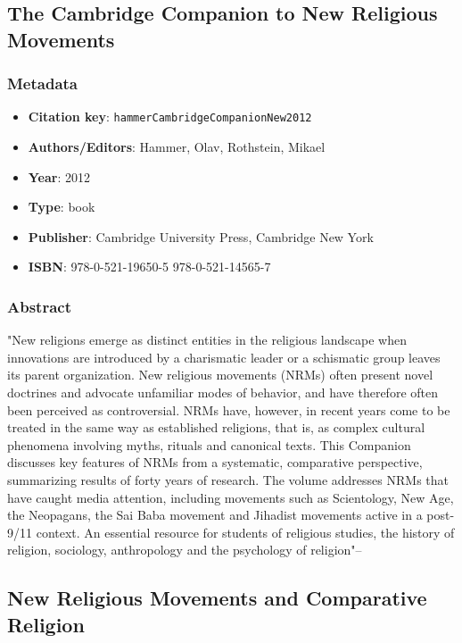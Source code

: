 \subsection{The Cambridge Companion to New Religious Movements}\label{lit:hammerCambridgeCompanionNew2012}
\subsubsection*{Metadata}
\begin{itemize}
  \item \textbf{Citation key}: \texttt{hammerCambridgeCompanionNew2012}
  \item \textbf{Authors/Editors}: Hammer, Olav, Rothstein, Mikael
  \item \textbf{Year}: 2012
  \item \textbf{Type}: book
  \item \textbf{Publisher}: Cambridge University Press, Cambridge New York
  \item \textbf{ISBN}: 978-0-521-19650-5 978-0-521-14565-7
\end{itemize}
\subsubsection*{Abstract}
"New religions emerge as distinct entities in the religious landscape when innovations are introduced by a charismatic leader or a schismatic group leaves its parent organization. New religious movements (NRMs) often present novel doctrines and advocate unfamiliar modes of behavior, and have therefore often been perceived as controversial. NRMs have, however, in recent years come to be treated in the same way as established religions, that is, as complex cultural phenomena involving myths, rituals and canonical texts. This Companion discusses key features of NRMs from a systematic, comparative perspective, summarizing results of forty years of research. The volume addresses NRMs that have caught media attention, including movements such as Scientology, New Age, the Neopagans, the Sai Baba movement and Jihadist movements active in a post-9/11 context. An essential resource for students of religious studies, the history of religion, sociology, anthropology and the psychology of religion"--

\subsection{New Religious Movements and Comparative Religion}\label{lit:hammerNewReligiousMovements2024}
